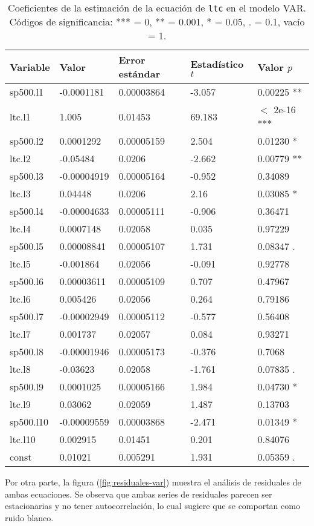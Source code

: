 \documentclass{article}
\begin{document}
\begin{table}[H]
\centering
\begin{tabularx}{0.9\textwidth}{XXXXX}
\toprule
Variable & Valor & Error estándar & Estadístico $t$ & Valor $p$ \\
\midrule
sp500.l1&-0.0001181&0.00003864&-3.057&0.00225 **\\
ltc.l1&1.005&0.01453&69.183& $<$ 2e-16 ***\\
sp500.l2&0.0001292&0.00005159&2.504&0.01230 *\\
ltc.l2&-0.05484&0.0206&-2.662&0.00779 **\\
sp500.l3&-0.00004919&0.00005164&-0.952&0.34089\\
ltc.l3&0.04448&0.0206&2.16&0.03085 *\\
sp500.l4&-0.00004633&0.00005111&-0.906&0.36471\\
ltc.l4&0.0007148&0.02058&0.035&0.97229\\
sp500.l5&0.00008841&0.00005107&1.731&0.08347 .\\
ltc.l5&-0.001864&0.02056&-0.091&0.92778\\
sp500.l6&0.00003611&0.00005109&0.707&0.47967\\
ltc.l6&0.005426&0.02056&0.264&0.79186\\
sp500.l7&-0.00002949&0.00005112&-0.577&0.56408\\
ltc.l7&0.001737&0.02057&0.084&0.93271\\
sp500.l8&-0.00001946&0.00005173&-0.376&0.7068\\
ltc.l8&-0.03623&0.02058&-1.761&0.07835 .\\
sp500.l9&0.0001025&0.00005166&1.984&0.04730 *\\
ltc.l9&0.03062&0.02059&1.487&0.13703\\
sp500.l10&-0.00009559&0.00003868&-2.471&0.01349 *\\
ltc.l10&0.002915&0.01451&0.201&0.84076\\
const&0.01021&0.005291&1.931&0.05359 .\\
\bottomrule
\end{tabularx}
\caption{\label{tab:var-ltc}Coeficientes de la estimación de la ecuación de \texttt{ltc} en el modelo VAR. Códigos de significancia: *** = 0, ** = 0.001, * = 0.05, . = 0.1, vacío = 1.}
\end{table}

Por otra parte, la figura (\ref{fig:residuales-var}) muestra el análisis de residuales de ambas ecuaciones. Se observa que ambas series de residuales parecen ser estacionarias y no tener autocorrelación, lo cual sugiere que se comportan como ruido blanco.
\end{document}
